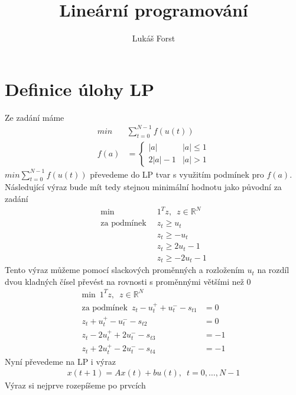 \documentclass[12pt]{article}
\begin{document}
    \title{Lineární programování}
    \author{Lukáš Forst}
    \maketitle

    \section{Definice úlohy LP}\label{sec:definice-úlohy-lp}
    Ze zadání máme
    \begin{align*}
        min & \sum_{t=0}^{N-1}f(u(t))\\
        f(a) &= \left
        \{ \begin{array}{ll}
               |a| & |a|\leq 1\\
               2|a|-1 & |a| >1
        \end{array} \right.
    \end{align*}
    $min \sum_{t=0}^{N-1}f(u(t))$  převedeme do LP tvar s využitím podmínek pro $f(a)$.\\
    Následující výraz bude mít tedy stejnou minimální hodnotu jako původní za zadání
    \begin{align*}
        \text{min} \enspace & 1^T z,\enspace z \in \mathbb{R}^N\\
        \text{za podmínek} \enspace & z_t \geq u_t\\
        &z_t  \geq -u_t\\
        &z_t  \geq 2u_t-1\\
        &z_t  \geq -2u_t-1
    \end{align*}
    Tento výraz můžeme pomocí slackových proměnných a rozložením \(u_t\) na rozdíl dvou kladných čísel převést na
    rovnosti s proměnnými většími než 0
    \begin{align*}
        \text{min} \enspace 1^T z,\enspace z \in \mathbb{R}^N\\
        \text{za podmínek} \enspace z_t - u_t^+ + u_t^- - s_{t1} &= 0\\
        z_t + u_t^+ - u_t^- - s_{t2} &= 0\\
        z_t - 2u_t^+ + 2u_t^- - s_{t3} &= -1\\
        z_t + 2u_t^+ - 2u_t^- - s_{t4} &= -1
    \end{align*}
    Nyní převedeme na LP i výraz
    \begin{align*}
        x(t+1) = Ax(t) +bu(t), \enspace t = 0,\ldots,N-1
    \end{align*}
    Výraz si nejprve rozepíšeme po prvcích
\end{document}
